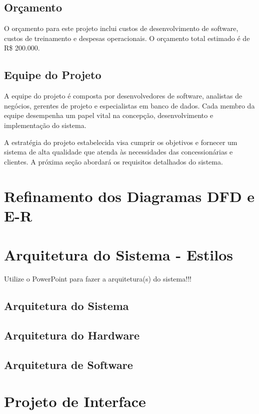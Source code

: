 \subsection{Orçamento}

O orçamento para este projeto inclui custos de desenvolvimento de software, custos de treinamento e despesas operacionais. O orçamento total estimado é de R\$ 200.000.

\subsection{Equipe do Projeto}

A equipe do projeto é composta por desenvolvedores de software, analistas de negócios, gerentes de projeto e especialistas em banco de dados. Cada membro da equipe desempenha um papel vital na concepção, desenvolvimento e implementação do sistema.

A estratégia do projeto estabelecida visa cumprir os objetivos e fornecer um sistema de alta qualidade que atenda às necessidades das concessionárias e clientes. A próxima seção abordará os requisitos detalhados do sistema.


\section{Refinamento dos Diagramas DFD e E-R}


\section{Arquitetura do Sistema - Estilos}

    Utilize o PowerPoint para fazer a arquitetura(s) do sistema!!!

    \subsection{Arquitetura do Sistema}



    \subsection{Arquitetura do Hardware}


    \subsection{Arquitetura de Software}


\section{Projeto de Interface}


